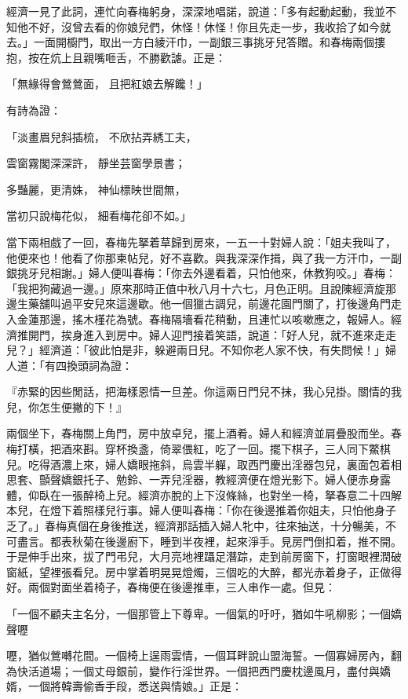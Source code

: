 \begin{showcontents}{}
經濟一見了此詞，連忙向春梅躬身，深深地唱諾，說道：「多有起動起動，我並不知他不好，沒曾去看的你娘兒們，休怪！休怪！你且先走一步，我收拾了如今就去。」一面開櫥門，取出一方白綾汗巾，一副銀三事挑牙兒答贈。和春梅兩個摟抱，按在炕上且親嘴咂舌，不勝歡謔。正是：

「無緣得會鶯鶯面，  且把紅娘去解饞！」

有詩為證：

「淡畫眉兒斜插梳，  不欣拈弄綉工夫，

雲窗霧閣深深許，  靜坐芸窗學景書；

多豔麗，更清姝，  神仙標映世間無，

當初只說梅花似，  細看梅花卻不如。」

當下兩相戲了一回，春梅先拏着草歸到房來，一五一十對婦人說：「姐夫我叫了，他便來也！他看了你那柬帖兒，好不喜歡。與我深深作揖，與了我一方汗巾，一副銀挑牙兒相謝。」婦人便叫春梅：「你去外邊看着，只怕他來，休教狗咬。」春梅：「我把狗藏過一邊。」原來那時正值中秋八月十六七，月色正明。且說陳經濟旋那邊生藥舖叫過平安兒來這邊歇。他一個獵古調兒，前邊花園門關了，打後邊角門走入金蓮那邊，搖木槿花為號。春梅隔墻看花稍動，且連忙以咳嗽應之，報婦人。經濟推開門，挨身進入到房中。婦人迎門接着笑語，說道：「好人兒，就不進來走走兒？」經濟道：「彼此怕是非，躲避兩日兒。不知你老人家不快，有失問候！」婦人道：「有四換頭詞為證：

『赤緊的因些閒話，把海樣恩情一旦差。你這兩日門兒不抹，我心兒掛。關情的我兒，你怎生便撇的下！』

兩個坐下，春梅關上角門，房中放卓兒，擺上酒肴。婦人和經濟並肩疊股而坐。春梅打橫，把酒來斟。穿杯換盞，倚翠偎紅，吃了一回。擺下棋子，三人同下鱉棋兒。吃得酒濃上來，婦人嬌眼拖斜，烏雲半軃，取西門慶出淫器包兒，裏面包着相思套、顫聲嬌銀托子、勉鈴、一弄兒淫器，教經濟便在燈光影下。婦人便赤身露體，仰臥在一張醉椅上兒。經濟亦脫的上下沒條絲，也對坐一椅，拏春意二十四解本兒，在燈下着照樣兒行事。婦人便叫春梅：「你在後邊推着你姐夫，只怕他身子乏了。」春梅真個在身後推送，經濟那話插入婦人牝中，往來抽送，十分暢美，不可盡言。都表秋菊在後邊廚下，睡到半夜裡，起來淨手。見房門倒扣着，推不開。于是伸手出來，拔了門弔兒，大月亮地裡躡足潛踪，走到前房窗下，打窗眼裡潤破窗紙，望裡張看兒。房中掌着明晃晃燈燭，三個吃的大醉，都光赤着身子，正做得好。兩個對面坐着椅子，春梅便在後邊推車，三人串作一處。但見：

「一個不顧夫主名分，一個那管上下尊卑。一個氣的吁吁，猶如牛吼柳影；一個嬌聲嚦

嚦，猶似鶯囀花間。一個椅上逞雨雲情，一個耳畔說山盟海誓。一個寡婦房內，翻為快活道場；一個丈母銀前，變作行淫世界。一個把西門慶枕邊風月，盡付與嬌婿，一個將韓壽偷香手段，悉送與情娘。」正是：


\end{showcontents}
